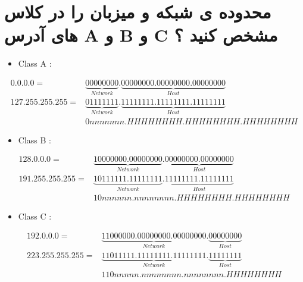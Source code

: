 \documentclass{article}
\begin{document}
\newpage


\section{محدوده ی شبکه و میزبان را در کلاس های آدرس
A و B و C مشخص کنید ؟}


\begin{latin}
\begin{itemize}
	\item Class A :
\end{itemize}
\end{latin}
\begin{align*}
 0.  0.  0.  0 = &\underbrace{00000000}_{Network}.\underbrace{00000000.00000000.00000000}_{Host} \\
127.255.255.255 = &\underbrace{01111111}_{Network}.\underbrace{11111111.11111111.11111111}_{Host} \\
                  &0nnnnnnn.HHHHHHHH.HHHHHHHH.HHHHHHHH
\end{align*}


\begin{latin}
\begin{itemize}
	\item Class B :
\end{itemize}
\end{latin}
\begin{align*}
128.  0.  0.  0 = &\underbrace{10000000.00000000}_{Network}.\underbrace{00000000.00000000}_{Host} \\
191.255.255.255 = &\underbrace{10111111.11111111}_{Network}.\underbrace{11111111.11111111}_{Host} \\
                  &10nnnnnn.nnnnnnnn.HHHHHHHH.HHHHHHHH
\end{align*}


\begin{latin}
\begin{itemize}
	\item Class C :
\end{itemize}
\end{latin}
\begin{align*}
192.  0.  0.  0 = &\underbrace{11000000.00000000.00000000}_{Network}.\underbrace{00000000}_{Host} \\
223.255.255.255 = &\underbrace{11011111.11111111.11111111}_{Network}.\underbrace{11111111}_{Host} \\
                  &110nnnnn.nnnnnnnn.nnnnnnnn.HHHHHHHH
\end{align*}
\end{document}
